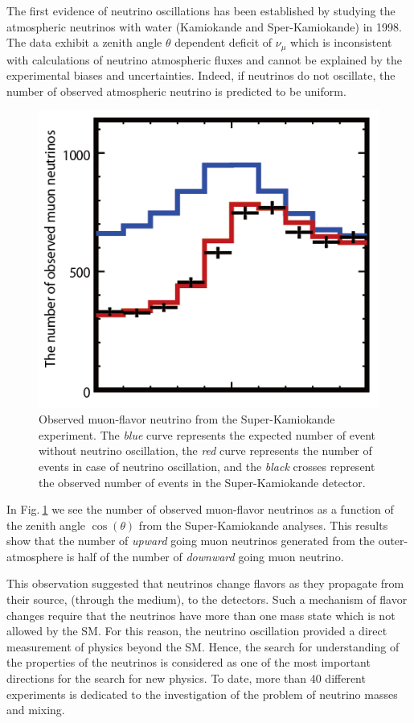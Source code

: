 \documentclass[twocolumn,secnumarabic,amssymb, nobibnotes, aps, prd,10pt]{revtex4-1}
\newcommand{\Fig}[1]{Fig.$\:$\ref{#1}}
\begin{document}
The first evidence of neutrino oscillations has been established by studying the 
atmospheric neutrinos with water \cite{Fukuda:1998mi, Ashie:2004mr} (Kamiokande and 
Sper-Kamiokande) in 1998. The data exhibit a zenith angle $\theta$ dependent deficit of 
$\nu_\mu$ which is inconsistent with calculations of neutrino atmospheric fluxes and 
cannot be explained by the experimental biases and uncertainties. Indeed, if neutrinos
do not oscillate, the number of observed atmospheric neutrino is predicted to be
uniform.
\begin{figure}
\centering
\includegraphics[scale=0.425]{zenith}
\caption{Observed muon-flavor neutrino from the Super-Kamiokande experiment. The \emph{blue}
curve represents the expected number of event without neutrino oscillation, the \emph{red}
curve represents the number of events in case of neutrino oscillation, and the \emph{black}
crosses represent the observed number of events in the Super-Kamiokande detector.}
\label{fig:superKami}
\end{figure}
In \Fig{fig:superKami} we see the number of observed muon-flavor neutrinos as a function of
the zenith angle $\cos (\theta)$ from the Super-Kamiokande analyses. This results show that
the number of \emph{upward} going muon neutrinos generated from the outer-atmosphere is half 
of the number of \emph{downward} going muon neutrino.

This observation suggested that neutrinos change flavors as they propagate from their source,
(through the medium), to the detectors. Such a mechanism of flavor changes require that the
neutrinos have more than one mass state which is not allowed by the SM. For this reason, the
neutrino oscillation provided a direct measurement of physics beyond the SM. Hence, the search
for understanding of the properties of the neutrinos is considered as one of the most important
directions for the search for new physics. To date, more than 40 different experiments is
dedicated to the investigation of the problem of neutrino masses and mixing.
\end{document}
